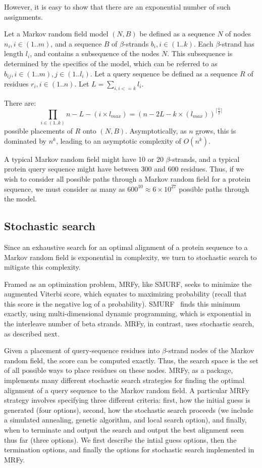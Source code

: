 \documentclass[blockstyle,times,preprint]{sigplanconf}
\begin{document}
However, it is easy to show that there are an exponential number of such
assignments.

Let a Markov random field model $(N,B)$ be defined as a sequence $N$ of nodes 
$n_{i}, i \in (1..m)$, and a sequence $B$ of $\beta$-strands 
$b_{i}, i \in (1..k)$.
Each $\beta$-strand has length $l_{i}$, and contains a subsequence of the nodes
$N$.
This subsequence is determined by the
specifics of the model, which can be referred to as $b_{ij}, i \in (1..m), j \in
(1..l_{i})$.
Let a query sequence be defined as a sequence $R$ of residues
$r_{i}, i \in (1..n)$.
Let $L = \displaystyle \sum \limits_{i, i <= k} l_{i}$.

There are:
\begin{equation*}
  \prod_{i \in (1..k)}{n - L - (i \times l_{max})} = 
  (n - 2L - k\times(l_{max}))^{\lceil \frac{k}{2} \rceil}
\end{equation*}
possible placements of $R$ onto $(N,B)$.
Asymptotically, as $n$ grows, this is dominated by $n^k$, leading to an
asymptotic complexity of $O(n^k)$.

A typical Markov random field might have 10 or 20 $\beta$-strands, and a typical
protein query sequence might have between 300 and 600 residues.
Thus, if we wish to consider all possible paths through a Markov random field
for a protein sequence, we must consider as many as 
$600^{10} \approx 6 \times 10^{27}$ possible paths through the model.

\subsection{Stochastic search}\label{stochastic-search}

Since an exhaustive search for an optimal alignment of a protein sequence to a
Markov random field is exponential in complexity, we turn to stochastic search
to mitigate this complexity.

Framed as an optimization problem, MRFy, like SMURF, seeks to minimize the 
augmented Viterbi
score, which equates to maximizing 
probability (recall that this score is the negative log of a probability).
SMURF~\cite{Menke:2010ti} finds this minimum exactly, using multi-dimensional dynamic programming,
which is exponential in the interleave number of beta strands.
MRFy, in contrast, uses stochastic search, as described next.

Given a placement of query-sequence residues into $\beta$-strand nodes of the
Markov random field, the score can be computed exactly.
Thus, the search space is the set of all possible ways to place residues on
these nodes.
MRFy, as a package, implements many different stochastic search strategies for
finding the optimal alignment of a query sequence to the Markov random field.
A particular MRFy strategy involves specifying three different criteria:
first, how the initial guess is generated (four options), second, how the
stochastic search proceeds (we include a simulated annealing, genetic algorithm,
and local search option), and finally, when to terminate and output the search
and output the best alignment seen thus far (three options). We first describe the intial guess options, then the termination options, and finally the options for stochastic search implemented in MRFy. 
\end{document}
